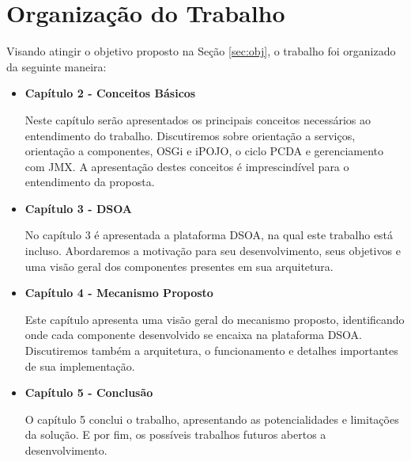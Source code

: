 \section{Organização do Trabalho}
Visando atingir o objetivo proposto na Seção \ref{sec:obj}, o trabalho foi organizado da seguinte maneira:
\begin{itemize}

\item \textbf{Capítulo 2 - Conceitos Básicos}

Neste capítulo serão apresentados os principais conceitos necessários ao entendimento do trabalho. Discutiremos sobre orientação a serviços, orientação a componentes, OSGi e iPOJO, o ciclo PCDA e gerenciamento com JMX. A apresentação destes conceitos é imprescindível para o entendimento da proposta.

\item \textbf{Capítulo 3 - DSOA}

No capítulo 3 é apresentada a plataforma DSOA, na qual este trabalho está incluso. Abordaremos a motivação para seu desenvolvimento, seus objetivos e uma visão geral dos componentes presentes em sua arquitetura.

\item \textbf{Capítulo 4 - Mecanismo Proposto}

Este capítulo apresenta uma visão geral do mecanismo proposto, identificando onde cada componente desenvolvido se encaixa na plataforma DSOA. Discutiremos também a arquitetura, o funcionamento e detalhes importantes de sua implementação.

\item \textbf{Capítulo 5 - Conclusão}

O capítulo 5 conclui o trabalho, apresentando as potencialidades e limitações da solução. E por fim, os possíveis trabalhos futuros abertos a desenvolvimento.

\end{itemize}


